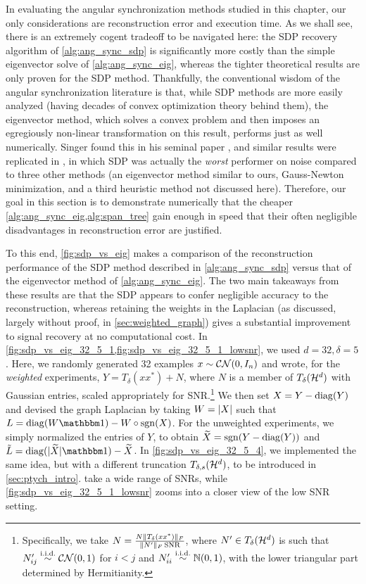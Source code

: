 In evaluating the angular synchronization methods studied in this chapter, our only considerations are reconstruction error and execution time.  As we shall see, there is an extremely cogent tradeoff to be navigated here: the SDP recovery algorithm of \cref{alg:ang_sync_sdp} is significantly more costly than the simple eigenvector solve of \cref{alg:ang_sync_eig}, whereas the tighter theoretical results are only proven for the SDP method.  Thankfully, the conventional wisdom of the angular synchronization literature is that, while SDP methods are more easily analyzed (having decades of convex optimization theory behind them), the eigenvector method, which solves a convex problem and then imposes an egregiously non-linear transformation on this result, performs just as well numerically.  Singer found this in his seminal paper \cite{singer2011ang_sync}, and similar results were replicated in \cite{calafiore2016complex_pgo}, in which SDP was actually the \emph{worst} performer on noise compared to three other methods (an eigenvector method similar to ours, Gauss-Newton minimization, and a third heuristic method not discussed here).  Therefore, our goal in this section is to demonstrate numerically that the cheaper \cref{alg:ang_sync_eig,alg:span_tree} gain enough in speed that their often negligible disadvantages in reconstruction error are justified.

To this end, \cref{fig:sdp_vs_eig} makes a comparison of the reconstruction performance of the SDP method described in \cref{alg:ang_sync_sdp} versus that of the eigenvector method of \cref{alg:ang_sync_eig}.  The two main takeaways from these results are that the SDP appears to confer negligible accuracy to the reconstruction, whereas retaining the weights in the Laplacian (as discussed, largely without proof, in \cref{sec:weighted_graph}) gives a substantial improvement to signal recovery at no computational cost.  In \cref{fig:sdp_vs_eig_32_5_1,fig:sdp_vs_eig_32_5_1_lowsnr}, we used $d = 32, \delta = 5$.  Here, we randomly generated 32 examples $x \sim \mathcal{C N}(0, I_n)$ and wrote, for the \emph{weighted} experiments, $Y = T_\delta(x x^*) + N$, where $N$ is a member of $T_\delta(\mathcal{H}^d)$ with Gaussian entries, scaled appropriately for SNR.\footnote{Specifically, we take $N = \frac{N \lVert T_{\delta}(x x^*)\rVert_F}{\lVert N'\rVert_F \operatorname{SNR}}$, where $N' \in T_\delta(\mathcal{H}^d)$ is such that $N'_{ij} \overset{\text{i.i.d.}}{\sim} \mathcal{C N}(0, 1)$ for $i < j$ and $N'_{ii} \overset{\text{i.i.d.}}{\sim} \mathbb{N}(0, 1)$, with the lower triangular part determined by Hermitianity.}  We then set $X = Y - \operatorname{diag}(Y)$ and devised the graph Laplacian by taking $W = \lvert X\rvert$ such that $L = \diag(W \one) - W \circ \sgn(X)$.  For the unweighted experiments, we simply normalized the entries of $Y$, to obtain $\widetilde{X} = \operatorname{sgn}(Y - \operatorname{diag}(Y))$ and $\tilde{L} = \diag(\abs{\tX} \one) - \tX$.  In \cref{fig:sdp_vs_eig_32_5_4}, we implemented the same idea, but with a different truncation $T_{\delta, s}(\mathcal{H}^d)$, to be introduced in \cref{sec:ptych_intro}.   take a wide range of SNRs, while \cref{fig:sdp_vs_eig_32_5_1_lowsnr} zooms into a closer view of the low SNR setting.


